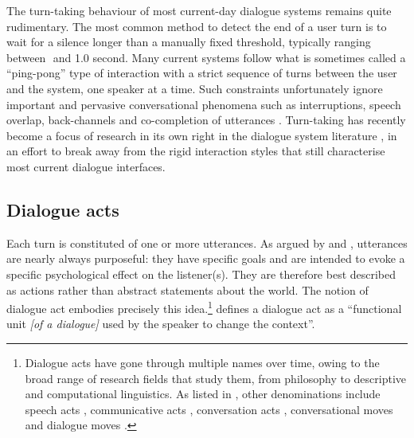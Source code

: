 The turn-taking behaviour of most current-day dialogue systems remains quite rudimentary.  The most common method to detect the end of a user turn is to wait for a silence longer than a manually fixed threshold, typically ranging between 
\textonehalf  $ $ and 1.0 second. Many current systems follow what is sometimes called a ``ping-pong'' type of interaction with a strict sequence of turns between the user and the system, one speaker at a time. Such constraints unfortunately ignore important and pervasive conversational phenomena such as interruptions, speech overlap, back-channels and co-completion of utterances \citep{StromS00,baumann2013:phd}. Turn-taking has recently become a focus of research in its own right in the dialogue system literature \citep{RauxE09,Gravano2011}, in an effort to break away from the rigid interaction styles that still characterise most current dialogue interfaces. 


\subsection{Dialogue acts}

Each turn is constituted of one or more utterances.  As argued by \cite{Austin1962} and \cite{Searle1969}, utterances are nearly always purposeful: they have specific goals and are intended to evoke a specific psychological effect on the listener(s).  They are therefore best described as actions rather than abstract statements about the world.  The notion of dialogue act embodies precisely this idea.\footnote{Dialogue acts have gone through multiple names over time, owing to the broad range of research fields that study them, from philosophy to descriptive and computational linguistics.  As listed in \cite{mctear2004}, other denominations include speech acts \citep{Searle1969}, communicative acts \citep{allwood1976}, conversation acts \citep{TraumH92}, conversational moves \citep{sinclair1975} and dialogue moves \citep{Larsson:2000}.} \cite[][p.~5]{Bunt1996} defines a dialogue act as a ``functional unit \textit{[of a dialogue]} used by the speaker to change the context''.  

